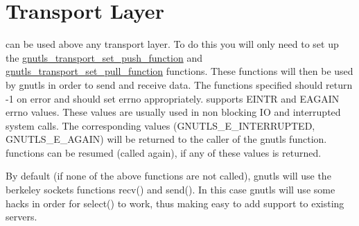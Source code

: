 \section{Transport Layer}
\par
\gnutls can be used above any transport layer. To do this you will only 
need to set up the 
\hyperref{gnutls\_transport\_set\_push\_function()}{gnutls\_transport\_set\_push\_function() (see Section }{
for more information)}{gnutls_transport_set_push_function} and
\hyperref{gnutls\_transport\_set\_pull\_function()}{gnutls\_transport\_set\_pull\_function() (see Section }{
for more information)}{gnutls_transport_set_pull_function}
functions. These functions will then be used by gnutls in order to send and receive data.
The functions specified should return -1 on error and should set errno appropriately.
\gnutls supports EINTR and EAGAIN errno values. These values are
usually used in non blocking IO and interrupted system calls.
The corresponding values (GNUTLS\_E\_INTERRUPTED, GNUTLS\_E\_AGAIN) 
will be returned to the caller of the gnutls function. \gnutls functions
can be resumed (called again), if any of these values is returned.
\par
By default (if none of the above functions are not called), gnutls will use
the berkeley sockets functions recv() and send(). In this case
gnutls will use some hacks in order for select() to work, thus
making easy to add \tls support to existing servers.


